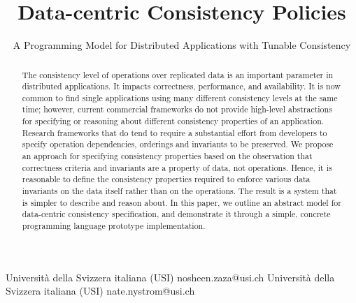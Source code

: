 \documentclass[preprint,numbers]{sigplanconf}
\begin{document}
\setlength{\pdfpageheight}{\paperheight}
\setlength{\pdfpagewidth}{\paperwidth}




\title{Data-centric Consistency Policies}
\subtitle{A Programming Model for Distributed Applications with Tunable Consistency}

           {Universit\`a della Svizzera italiana (USI)}
           {nosheen.zaza@usi.ch}
           {Universit\`a della Svizzera italiana (USI)}
           {nate.nystrom@usi.ch}

\maketitle

\begin{abstract}
The consistency level of operations over replicated data is 
an important parameter in distributed applications. It impacts correctness, 
performance, and availability. It is now common to find single applications
using many different consistency
levels at the same time; however, current commercial frameworks do not
provide high-level abstractions for specifying or reasoning about different
consistency properties of an application. Research frameworks that do tend to require a
substantial effort from developers to specify operation dependencies, orderings
and invariants to be preserved.
We propose an approach for specifying consistency properties based on the
observation that
correctness criteria and invariants are a property of data, not operations.
Hence, it is reasonable to define the consistency properties
required to enforce various data invariants on the data itself rather than on the operations. 
The result is a system that is simpler to describe and reason about. 
In this paper, we outline an abstract model
for data-centric consistency specification, and demonstrate it through a simple,
concrete programming language prototype implementation.
\end{abstract}
\end{document}
